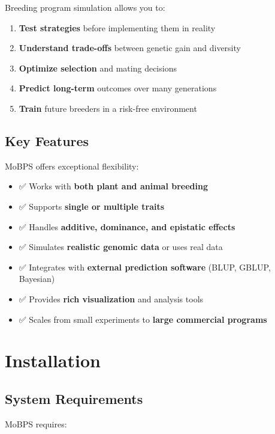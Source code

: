 \documentclass[
  letterpaper,
]{book}
\providecommand{\tightlist}{%
  \setlength{\itemsep}{0pt}\setlength{\parskip}{0pt}}
\begin{document}
Breeding program simulation allows you to:

\begin{enumerate}
\def\labelenumi{\arabic{enumi}.}
\tightlist
\item
  \textbf{Test strategies} before implementing them in reality
\item
  \textbf{Understand trade-offs} between genetic gain and diversity
\item
  \textbf{Optimize selection} and mating decisions
\item
  \textbf{Predict long-term} outcomes over many generations
\item
  \textbf{Train} future breeders in a risk-free environment
\end{enumerate}

\subsection{Key Features}\label{key-features}

MoBPS offers exceptional flexibility:

\begin{itemize}
\tightlist
\item
  ✅ Works with \textbf{both plant and animal breeding}
\item
  ✅ Supports \textbf{single or multiple traits}
\item
  ✅ Handles \textbf{additive, dominance, and epistatic effects}
\item
  ✅ Simulates \textbf{realistic genomic data} or uses real data
\item
  ✅ Integrates with \textbf{external prediction software} (BLUP, GBLUP,
  Bayesian)
\item
  ✅ Provides \textbf{rich visualization} and analysis tools
\item
  ✅ Scales from small experiments to \textbf{large commercial programs}
\end{itemize}

\section{Installation}\label{sec-installation}

\subsection{System Requirements}\label{system-requirements}

MoBPS requires:
\end{document}
